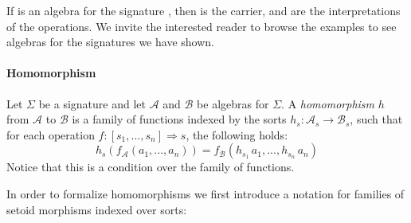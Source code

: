 \noindent If  is an algebra for the signature , then
  is the carrier, 
  and
 are the interpretations
of the operations. We invite the interested reader to browse the examples to
see algebras for the signatures we have shown.

\paragraph*{Homomorphism}
Let $\Sigma$ be a signature and let $\mathcal{A}$ and $\mathcal{B}$ be
algebras for $\Sigma$. A \emph{homomorphism} $h$ from $\mathcal{A}$ to
$\mathcal{B}$ is a family of functions indexed by the sorts
$h_s : \mathcal{A}_s \rightarrow \mathcal{B}_s$, such that for each
operation $f : [s_1,...,s_n] \Rightarrow s$, the following holds:
\begin{equation}
  h_s(f_{\mathcal{A}}(a_1,...,a_n)) = f_{\mathcal{B}}(h_{s_1}\,a_1,...,h_{s_n}\,a_n)\label{eq:homcond}
\end{equation}
\noindent Notice that this is a condition over the family of
functions.

In order to formalize homomorphisms we first introduce a
notation for families of setoid morphisms indexed over sorts:


\begin{code}
\>[0]\AgdaSpace{}%
\AgdaSymbol{:}\AgdaSpace{}%
\AgdaSpace{}%
\AgdaSymbol{\{}\AgdaSymbol{\}}\AgdaSpace{}%
\AgdaSpace{}%
\AgdaSpace{}%
\AgdaSpace{}%
\AgdaSpace{}%
\AgdaSpace{}%
\AgdaSpace{}%
\AgdaSpace{}%
\<%
\\
\>[0]\AgdaSpace{}%
\AgdaSymbol{\{}\AgdaSymbol{\}}\AgdaSpace{}%
\AgdaSpace{}%
\AgdaSpace{}%
\AgdaSymbol{=}\AgdaSpace{}%
\AgdaSymbol{(}\AgdaSpace{}%
\AgdaSymbol{:}\AgdaSpace{}%
\AgdaSpace{}%
\AgdaSymbol{)}\AgdaSpace{}%
\AgdaSpace{}%
\AgdaSpace{}%
\AgdaSpace{}%
\AgdaSpace{}%
\AgdaSpace{}%
\AgdaSpace{}%
\AgdaSpace{}%
\AgdaSpace{}%
\AgdaSpace{}%
\<%
\end{code}



